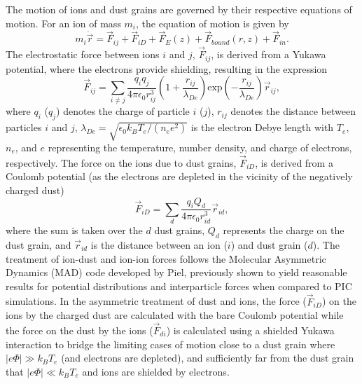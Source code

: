\documentclass[aip,amsmath,amssymb,graphicx,floatfix,reprint]{revtex4-1}
\begin{document}
The motion of ions and dust grains are governed by their respective equations of motion.  For an ion of mass $m_i$, the equation of motion is given by 
\begin{equation} m_i \ddot{\vec{r}} = \vec{F}_{ij} + \vec{F}_{iD} + \vec{F}_E(z) + \vec{F}_{bound}(r,z) + \vec{F}_{in}. \label{eq:ionEqMotion}\end{equation}
The electrostatic force between ions $i$ and $j$, $\vec{F}_{ij}$, is derived from a Yukawa potential, where the electrons provide shielding, resulting in the expression \begin{equation} \vec{F}_{ij} = \sum_{i \neq j} \frac{q_i q_j}{4\pi \epsilon_0 r_{ij}^3}\left( 1 + \frac{r_{ij}}{\lambda_{De}}\right) \mathrm{exp}\left(-\frac{r_{ij}}{\lambda_{De}}\right)\vec{r}_{ij},\label{eq:forceii}\end{equation}
where $q_i$ ($q_j$) denotes the charge of particle $i$ ($j$), $r_{ij}$ denotes the distance between particles $i$ and $j$, $\lambda_{De} = \sqrt{\epsilon_0 k_B T_e/(n_e e^2)}$ is the electron Debye length with $T_e$, $n_e$, and $e$ representing the temperature, number density, and charge of electrons, respectively.  The force on the ions due to dust grains, $\vec{F}_{iD}$, is derived from a Coulomb potential (as the electrons are depleted in the vicinity of the negatively charged dust\cite{Piel2017}) \begin{equation} \vec{F}_{iD} = \sum_d \frac{q_i Q_d}{4 \pi \epsilon_0 r_{id}^3}\vec{r}_{id}, \label{eq:forceid}\end{equation} 
where the sum is taken over the $d$ dust grains, $Q_d$ represents the charge on the dust grain, and $\vec{r}_{id}$ is the distance between an ion ($i$) and dust grain ($d$).  The treatment of ion-dust and ion-ion forces follows the Molecular Asymmetric Dynamics (MAD) code developed by Piel\cite{Piel2017}, previously shown to yield reasonable results for potential distributions and interparticle forces when compared to PIC simulations.  In the asymmetric treatment of dust and ions, the force ($\vec{F}_{iD}$) on the ions by the charged dust are calculated with the bare Coulomb potential while the force on the dust by the ions ($\vec{F}_{di}$) is calculated using a shielded Yukawa interaction to bridge the limiting cases of motion close to a dust grain where $|e\Phi | \gg k_B T_e$ (and electrons are depleted), and sufficiently far from the dust grain that $|e\Phi | \ll k_B T_e$ and ions are shielded by electrons.
\end{document}
